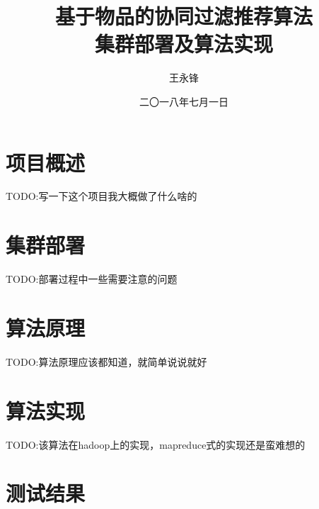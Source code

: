 \documentclass[forprint]{myreport}
\begin{document}
\title{ 基于物品的协同过滤推荐算法 \\ 集群部署及算法实现}
\author{王永锋}                            %
\date{二〇一八年七月一日}                %
\maketitle
\frontmatter
\tableofcontents
\mainmatter 

\chapter{项目概述}

TODO:写一下这个项目我大概做了什么啥的

\chapter{集群部署}

TODO:部署过程中一些需要注意的问题

\chapter{算法原理}


TODO:算法原理应该都知道，就简单说说就好


\chapter{算法实现}

TODO:该算法在hadoop上的实现，mapreduce式的实现还是蛮难想的

\chapter{测试结果}
\end{document}
